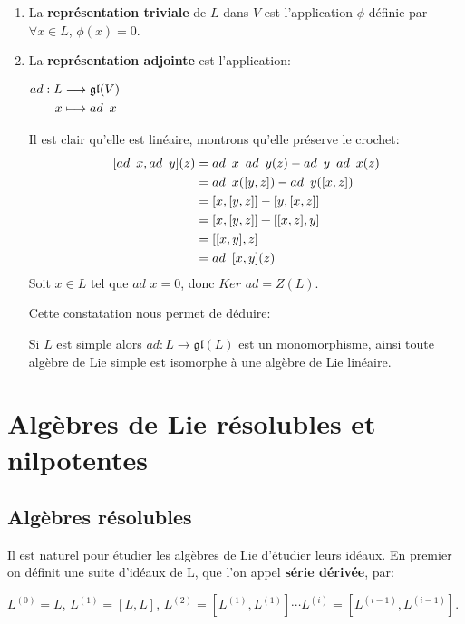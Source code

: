 \documentclass[a4paper,openany,12pt]{report}
\newcommand{\gl}{\mathfrak{gl}}
\theoremstyle{break}
{\theorembodyfont{\upshape}
\newtheorem*{rmq}{Remarque :}
\newtheorem*{prv}{Preuve :}
\newtheorem*{ex}{Exemples :}
\newtheorem*{exe}{Exemple : }
\newtheorem*{nota}{Notation :}
\newtheorem*{dem}{D\'emonstration :}}
\begin{document}
\begin{ex}
\begin{enumerate}

\item La \textbf{représentation triviale} de $L$ dans $V$ est l'application $\phi$ définie par $\forall x \in L$, $\phi(x)=0$.

\item La \textbf{représentation adjointe} est l'application:
\begin{center}
$
\begin{aligned}
ad : L & \longrightarrow \gl(V) \\
x & \longmapsto ad \enskip x 
\end{aligned}$
\end{center}
Il est clair qu'elle est linéaire, montrons qu'elle préserve le crochet:
\[
\begin{aligned}
[ad \enskip x, ad \enskip y](z) & = ad \enskip x \enskip ad \enskip y(z)- ad \enskip y \enskip ad \enskip x(z) \\
& = ad \enskip x([y,z])-ad \enskip y([x,z]) \\
& = [x,[y,z]]-[y,[x,z]] \\
& = [x,[y,z]]+[[x,z],y] \\
& = [[x,y],z] \\
& = ad \enskip [x,y](z)
\end{aligned} \]
Soit $x \in L$ tel que $ad$ $x = 0$, donc $Ker$ $ad = Z(L)$. 

Cette constatation nous permet de déduire:
\medskip

\quad Si $L$ est simple alors $ad: L \longrightarrow \gl(L)$ est un monomorphisme, ainsi toute algèbre de Lie simple est isomorphe à une algèbre de Lie linéaire.
\end{enumerate}
\end{ex}

\section{Algèbres de Lie résolubles et nilpotentes}

\subsection{Algèbres résolubles}\label{d}

\quad Il est naturel pour étudier les algèbres de Lie d'étudier leurs idéaux. En premier on définit une suite d'idéaux de L, que l'on appel \textbf{série dérivée}, par:
\begin{center}
$L^{(0)} = L$, $L^{(1)} = [L,L]$, $L^{(2)} = [L^{(1)},L^{(1)}] \cdots L^{(i)} = [L^{(i-1)},L^{(i-1)}]$.
\end{center}
\end{document}
